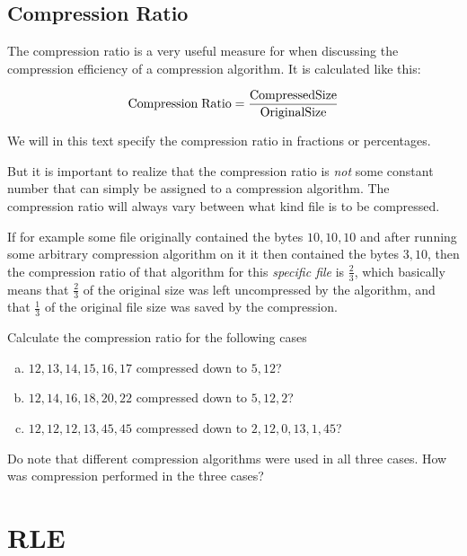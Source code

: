 \subsection{Compression Ratio}

The compression ratio is a very useful
measure for when discussing the compression efficiency of a
compression algorithm. It is calculated like this:

\begin{equation*}
  {\rm Compression\;Ratio} = \frac{{\rm Compressed Size}}{{\rm Original Size}}
\end{equation*}

We will in this text specify the compression ratio in fractions or
percentages.

But it is important to realize that the compression ratio is
\textit{not} some constant number that can simply be assigned to a
compression algorithm. The compression ratio will always vary between
what kind file is to be compressed.

If for example some file originally contained the bytes $10,10,10$ and
after running some arbitrary compression algorithm on it it then
contained the bytes $3,10$, then the compression ratio of that
algorithm for this \textit{specific file} is $\frac{2}{3}$, which
basically means that $\frac{2}{3}$ of the original size was left
uncompressed by the algorithm, and that $\frac{1}{3}$ of the original
file size was saved by the compression.

\begin{Exercise}[label={compression-ratio}]

  Calculate the compression ratio for the following cases

  \begin{enumerate}[(a)]
  \item $12,13,14,15,16,17$ compressed down to $5,12$?
  \item $12,14,16,18,20,22$ compressed down to $5,12,2$?
  \item $12,12,12,13,45,45$ compressed down to $2,12,0,13,1,45$?
  \end{enumerate}

  Do note that different compression algorithms were used in all three
  cases. How was compression performed in the three cases?

\end{Exercise}

\section{RLE}
\label{sec:rle}

